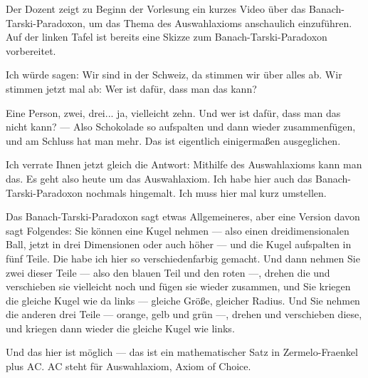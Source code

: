 \begin{meta-note}
Der Dozent zeigt zu Beginn der Vorlesung ein kurzes Video über das Banach-Tarski-Paradoxon, um das Thema des Auswahlaxioms anschaulich einzuführen. Auf der linken Tafel ist bereits eine Skizze zum Banach-Tarski-Paradoxon vorbereitet.
\end{meta-note}

\begin{spoken-clean}[00:01:46 - 00:03:50]
Ich würde sagen: Wir sind in der Schweiz, da stimmen wir über alles ab. Wir stimmen jetzt mal ab: Wer ist dafür, dass man das kann?


Eine Person, zwei, drei... ja, vielleicht zehn. Und wer ist dafür, dass man das nicht kann? --- Also Schokolade so aufspalten und dann wieder zusammenfügen, und am Schluss hat man mehr. Das ist eigentlich einigermaßen ausgeglichen.

Ich verrate Ihnen jetzt gleich die Antwort: Mithilfe des Auswahlaxioms kann man das. Es geht also heute um das Auswahlaxiom. Ich habe hier auch das Banach-Tarski-Paradoxon nochmals hingemalt. Ich muss hier mal kurz umstellen.


Das Banach-Tarski-Paradoxon sagt etwas Allgemeineres, aber eine Version davon sagt Folgendes: Sie können eine Kugel nehmen --- also einen dreidimensionalen Ball, jetzt in drei Dimensionen oder auch höher --- und die Kugel aufspalten in fünf Teile. Die habe ich hier so verschiedenfarbig gemacht. Und dann nehmen Sie zwei dieser Teile --- also den blauen Teil und den roten ---, drehen die und verschieben sie vielleicht noch und fügen sie wieder zusammen, und Sie kriegen die gleiche Kugel wie da links --- gleiche Größe, gleicher Radius. Und Sie nehmen die anderen drei Teile --- orange, gelb und grün ---, drehen und verschieben diese, und kriegen dann wieder die gleiche Kugel wie links.

Und das hier ist möglich --- das ist ein mathematischer Satz in Zermelo-Fraenkel plus $\text{AC}$. $\text{AC}$ steht für Auswahlaxiom, Axiom of Choice.
\end{spoken-clean}

